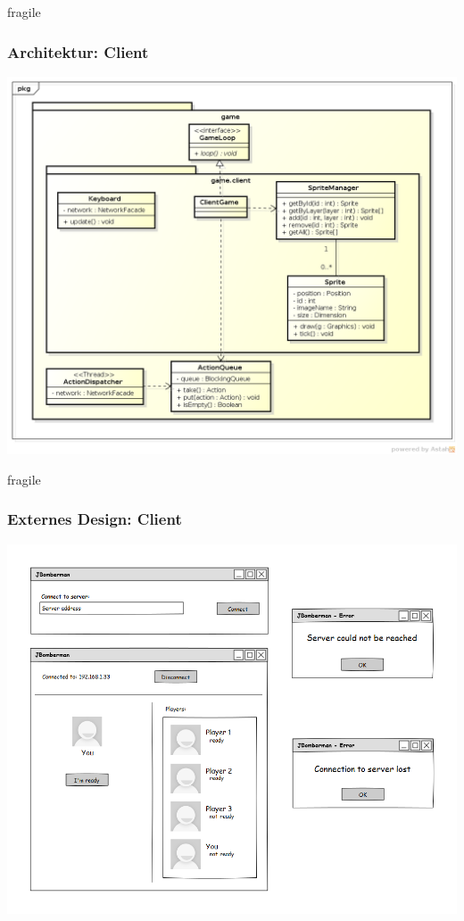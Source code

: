 \documentclass[10pt, compress]{beamer}
\begin{document}
\begin{frame}{fragile}
	\frametitle{Architektur: Client}
	\begin{center}
	\includegraphics[scale=0.3]{ClassDiagramGameClient}
	\end{center}
\end{frame}

\begin{frame}{fragile}
	\frametitle{Externes Design: Client}
	\begin{center}
	  \includegraphics[scale=0.25]{client}
	\end{center}
	
\end{frame}
\end{document}
